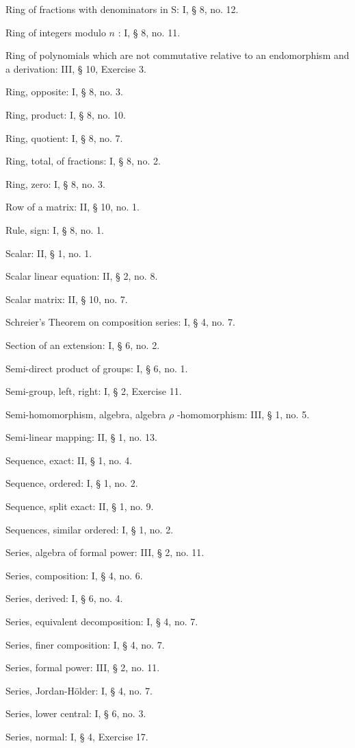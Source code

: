 Ring of fractions with denominators in S: I, § 8, no. 12.

Ring of integers modulo \(n\) : I, § 8, no. 11.

Ring of polynomials which are not commutative relative to an endomorphism and a derivation: III, § 10, Exercise 3.

Ring, opposite: I, § 8, no. 3.

Ring, product: I, § 8, no. 10.

Ring, quotient: I, § 8, no. 7.

Ring, total, of fractions: I, § 8, no. 2.

Ring, zero: I, § 8, no. 3.

Row of a matrix: II, § 10, no. 1.

Rule, sign: I, § 8, no. 1.

Scalar: II, § 1, no. 1.

Scalar linear equation: II, § 2, no. 8.

Scalar matrix: II, § 10, no. 7.

Schreier's Theorem on composition series: I, § 4, no. 7.

Section of an extension: I, § 6, no. 2.

Semi-direct product of groups: I, § 6, no. 1.

Semi-group, left, right: I, § 2, Exercise 11.

Semi-homomorphism, algebra, algebra \(\rho\) -homomorphism: III, § 1, no. 5.

Semi-linear mapping: II, § 1, no. 13.

Sequence, exact: II, § 1, no. 4.

Sequence, ordered: I, § 1, no. 2.

Sequence, split exact: II, § 1, no. 9.

Sequences, similar ordered: I, § 1, no. 2.

Series, algebra of formal power: III, § 2, no. 11.

Series, composition: I, § 4, no. 6.

Series, derived: I, § 6, no. 4.

Series, equivalent decomposition: I, § 4, no. 7.

Series, finer composition: I, § 4, no. 7.

Series, formal power: III, § 2, no. 11.

Series, Jordan-Hölder: I, § 4, no. 7.

Series, lower central: I, § 6, no. 3.

Series, normal: I, § 4, Exercise 17.

